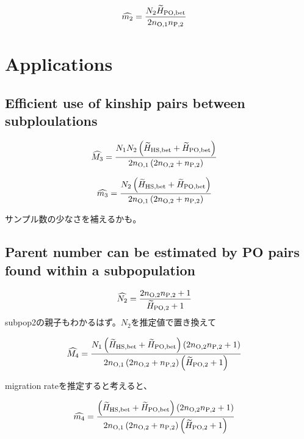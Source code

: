 \documentclass[AMA,STIX1COL]{WileyNJD-v2}
\begin{document}
\begin{align}
\widehat{m_2} &= \frac{N_{2} \widetilde{H}_{\rm PO,bet} } {2 n_{\rm O, 1} n_{\rm P, 2} }
\label{PO-4}
\end{align}

\section{Applications}\label{sec3}

\subsection{Efficient use of kinship pairs between subploulations}

\begin{align}
\widehat{M_3} &= \frac{ N_{1} N_{2} \left(\widetilde{H}_{\rm HS,bet} + \widetilde{H}_{\rm PO,bet}\right) } {2n_{\rm O, 1} \left(2 n_{\rm O, 2} + n_{\rm P, 2}\right) }
\label{AP-1}
\end{align}

\begin{align}
\widehat{m_3} &= \frac{ N_{2} \left(\widetilde{H}_{\rm HS,bet} + \widetilde{H}_{\rm PO,bet}\right) } {2n_{\rm O, 1} \left(2 n_{\rm O, 2} + n_{\rm P, 2}\right) }
\label{AP-2}
\end{align}

サンプル数の少なさを補えるかも。

\subsection{Parent number can be estimated by PO pairs found within a subpopulation}

\begin{align}
\widehat{N_2} &= \frac{ 2 n_{\rm O, 2} n_{\rm P, 2} + 1 }{\widetilde{H}_{\rm PO, 2} + 1} 
\label{AP-3}
\end{align}
subpop2の親子もわかるはず。$N_2$を推定値で置き換えて

\begin{align}
\widehat{M_4} &=  \frac{ N_{1} \left(\widetilde{H}_{\rm HS,bet} + \widetilde{H}_{\rm PO,bet}\right) \left(2 n_{\rm O, 2} n_{\rm P, 2} + 1\right)} {2n_{\rm O, 1} \left(2 n_{\rm O, 2} + n_{\rm P, 2}\right) \left(\widetilde{H}_{\rm PO, 2} + 1\right)}
\label{AP-4}
\end{align}

migration rateを推定すると考えると、

\begin{align}
\widehat{m_4} &=  \frac{ \left(\widetilde{H}_{\rm HS,bet} + \widetilde{H}_{\rm PO,bet}\right) \left(2 n_{\rm O, 2} n_{\rm P, 2} + 1\right)} {2n_{\rm O, 1} \left(2 n_{\rm O, 2} + n_{\rm P, 2}\right) \left(\widetilde{H}_{\rm PO, 2} + 1\right)}
\label{AP-5}
\end{align}
\end{document}
